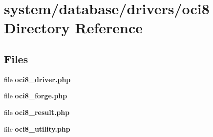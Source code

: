 \section{system/database/drivers/oci8 Directory Reference}
\label{dir_86f43e1240547d452a9e47a1935ff608}
\subsection*{Files}
\begin{DoxyCompactItemize}
\item 
file {\bf oci8\-\_\-driver.\-php}
\item 
file {\bf oci8\-\_\-forge.\-php}
\item 
file {\bf oci8\-\_\-result.\-php}
\item 
file {\bf oci8\-\_\-utility.\-php}
\end{DoxyCompactItemize}
